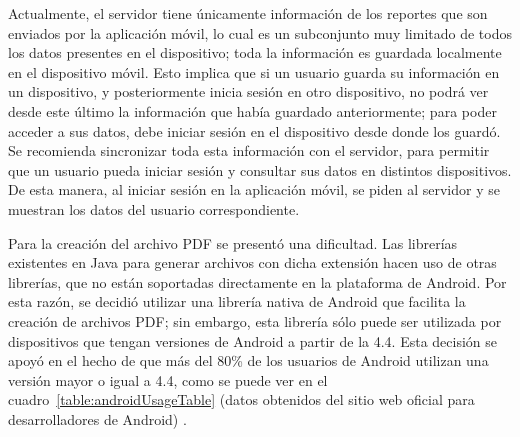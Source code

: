 Actualmente, el servidor tiene únicamente información de los reportes que son enviados por la aplicación móvil, lo cual es un subconjunto  muy limitado de todos los datos presentes en el dispositivo; toda la información es guardada localmente en el dispositivo móvil. Esto implica que si un usuario guarda su información en un dispositivo, y posteriormente inicia sesión en otro dispositivo, no podrá ver desde este último la información que había guardado anteriormente; para poder acceder a sus datos, debe iniciar sesión en el dispositivo desde donde los guardó. Se recomienda sincronizar toda esta información con el servidor, para permitir que un usuario pueda iniciar sesión y consultar sus datos en distintos dispositivos. De esta manera, al iniciar sesión en la aplicación móvil, se piden al servidor y se muestran los datos del usuario correspondiente. 


Para la creación del archivo PDF se presentó una dificultad. Las librerías existentes en Java para generar archivos con dicha extensión hacen uso de otras librerías, que no están soportadas directamente en la plataforma de Android. Por esta razón, se decidió utilizar una librería nativa de Android que facilita la creación de archivos PDF; sin embargo, esta librería sólo puede ser utilizada por dispositivos que tengan versiones de Android a partir de la 4.4. Esta decisión se apoyó en el hecho de que más del 80\% de los usuarios de Android utilizan una versión mayor o igual a 4.4, como se puede ver en el cuadro~\ref{table:androidUsageTable} (datos obtenidos del sitio web oficial para desarrolladores de Android) \cite{USG1}. 

